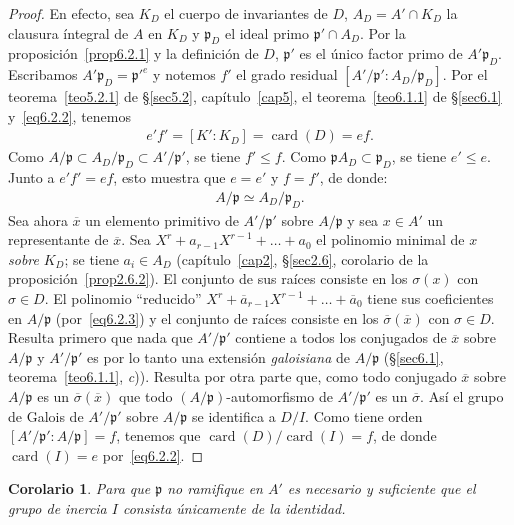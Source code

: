 \documentclass[10pt,oneside,bibtotoc,smallheadings,leqno,a5paper,DIV=12]{scrbook}
\newcommand{\idl}[1]{\mathfrak{#1}}
\newcommand{\QED}{}%
\newcommand{\oline}[1]{\overline{#1}}
\DeclareMathOperator{\card}{card}
\numberwithin{equation}{section}
\theoremstyle{defi}
\theoremstyle{enonce}
\newtheorem*{corollary*}{Corolario}
\theoremstyle{rem}
\numberwithin{theorem}{section}
\numberwithin{proposition}{section}
\numberwithin{definition}{section}
\numberwithin{lemma}{section}
\numberwithin{corollary}{section}
\numberwithin{example}{section}
\numberwithin{footnote}{section}%
\begin{document}
\begin{proof}
En efecto, sea $K_{D}$ el cuerpo de invariantes de $D$, $A_{D} = A'\cap K_{D}$ la clausura \'integral de
$A$ en $K_{D}$ y $\idl{p}_{D}$ el ideal primo $\idl{p}'\cap A_{D}$. Por la
proposici\'on~\ref{prop6.2.1} y la definici\'on
de $D$, $\idl{p}'$ es el \'unico factor primo de $A'\idl{p}_{D}$. Escribamos $A'\idl{p}_{D} = \idl{p}'^{e}$
y notemos $f'$ el grado residual $[A'/\idl{p}':A_{D}/\idl{p}_{D}]$. Por el teorema~\ref{teo5.2.1} de \S\ref{sec5.2},
cap\'itulo~\ref{cap5},
el teorema~\ref{teo6.1.1} de \S\ref{sec6.1} y~\eqref{eq6.2.2}, tenemos
\begin{gather*}
e'f'=[K':K_{D}]=\card(D)=ef.
\end{gather*}
Como $A/\idl{p}\subset A_{D}/\idl{p}_{D}\subset A'/\idl{p}'$, se tiene $f'\leq f$. Como $\idl{p}A_{D}\subset\idl{p}_{D}$,
se tiene $e'\leq e$. Junto a $e'f'=ef$, esto muestra que $e=e'$ y $f=f'$, de donde:
\begin{gather}\label{eq6.2.3}
A/\idl{p}\simeq A_{D}/\idl{p}_{D}.
\end{gather}
Sea ahora $\oline x$ un elemento primitivo de $A'/\idl{p}'$ sobre $A/\idl{p}$ y sea $x\in A'$ un
representante de $\oline x$. Sea $X^{r}+a_{r-1}X^{r-1}+\dots+a_{0}$ el polinomio minimal de $x$
{\em sobre} $K_{D}$; se tiene $a_{i}\in A_{D}$ (cap\'itulo~\ref{cap2}, \S\ref{sec2.6},
corolario de la proposici\'on~\ref{prop2.6.2}).
El conjunto de sus ra\'ices consiste en los $\sigma(x)$ con $\sigma\in D$. El polinomio
``reducido'' $X^{r}+\oline a_{r-1}X^{r-1}+\dots+\oline a_{0}$ tiene sus coeficientes en $A/\idl{p}$
(por~\eqref{eq6.2.3}) y el conjunto de ra\'ices consiste en los $\oline\sigma(\oline x)$ con $\sigma\in D$. Resulta
primero que nada que $A'/\idl{p}'$ contiene a todos los conjugados de $\oline x$ sobre $A/\idl{p}$ y
$A'/\idl{p}'$ es por lo tanto una extensi\'on {\em galoisiana} de $A/\idl{p}$
(\S\ref{sec6.1}, teorema~\ref{teo6.1.1}, {\itshape c})). Resulta por otra parte que, como todo conjugado $\oline x$ sobre $A/\idl{p}$
es un $\oline\sigma(\oline x)$ que todo $(A/\idl{p})$-automorfismo de $A'/\idl{p}'$ es un $\oline\sigma$.
As\'i el grupo de Galois de $A'/\idl{p}'$ sobre $A/\idl{p}$ se identifica a $D/I$. Como tiene orden
$[A'/\idl{p}':A/\idl{p}]=f$, tenemos que $\card(D)/\card(I) = f$, de donde $\card(I) = e$ por~\eqref{eq6.2.2}. \QED
\end{proof}

\begin{corollary*}
Para que $\idl{p}$ no ramifique en $A'$ es necesario y suficiente que el grupo de inercia $I$ consista
\'unicamente de la identidad.
\end{corollary*}
\end{document}
